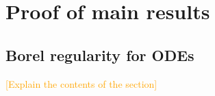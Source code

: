 \documentclass{article}
\newcommand{\Z}{\mathbb{Z}}
\newcommand{\R}{\mathbb{R}}
\newcommand{\laplacepde}{\mathcal{D}}
\newcommand{\laplace}{\mathcal{L}}
\theoremstyle{definition}
\theoremstyle{plain}
\begin{document}



\section{Proof of main results}\label{sec:proof_main_results}
\subsection{Borel regularity for ODEs}\label{borel_reg-ODE}
\textcolor{orange}{[Explain the contents of the section]}
\end{document}
